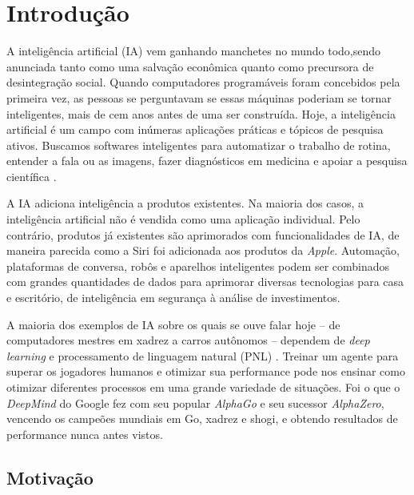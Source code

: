 \chapter{Introdução}

A inteligência artificial (IA) vem ganhando manchetes no mundo todo,sendo anunciada tanto como uma salvação econômica quanto como precursora de desintegração social. Quando computadores programáveis foram concebidos pela primeira vez, as pessoas se perguntavam se essas máquinas poderiam se tornar inteligentes, mais de cem anos antes de uma ser construída.
 Hoje, a inteligência artificial é um campo com inúmeras aplicações práticas e tópicos de pesquisa ativos. Buscamos softwares inteligentes para automatizar o trabalho de rotina, entender a fala ou as imagens, fazer diagnósticos em medicina e apoiar a pesquisa científica \cite{Goodfellow-et-al-2016}.


A IA adiciona inteligência a produtos existentes. Na maioria dos casos, a inteligência artificial não é vendida como uma aplicação individual. Pelo contrário, produtos já existentes são aprimorados com funcionalidades de IA, de maneira parecida como a Siri foi adicionada aos produtos da \textit{Apple}. Automação, plataformas de conversa, robôs e aparelhos inteligentes podem ser combinados com grandes quantidades de dados para aprimorar diversas tecnologias para casa e escritório, de inteligência em segurança à análise de investimentos.

A maioria dos exemplos de IA sobre os quais se ouve falar hoje – de computadores mestres em xadrez a carros autônomos – dependem de \textit{deep learning} e processamento de linguagem natural (PNL) \cite{pln-o-que-e}. Treinar um agente para superar os jogadores humanos e otimizar sua performance pode nos ensinar como otimizar diferentes processos em uma grande variedade de situações. Foi o que o \textit{DeepMind} do Google fez com seu popular \textit{AlphaGo} e seu sucessor \textit{AlphaZero}, vencendo os campeões mundiais em Go, xadrez e shogi, e obtendo resultados de performance nunca antes vistos.

\section{Motivação}

